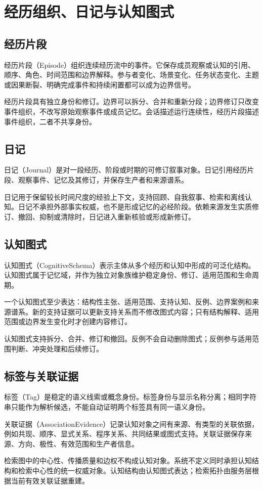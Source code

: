 \chapter{经历组织、日记与认知图式}

\section{经历片段}

经历片段（Episode）组织连续经历流中的事件。它保存成员观察或认知的引用、顺序、角色、时间范围和边界解释。参与者变化、场景变化、任务状态变化、主题或因果断裂、明确完成事件和持续闲置都可以成为边界信号。

经历片段具有独立身份和修订。边界可以拆分、合并和重新分段；边界修订只改变事件组织，不改写原始观察事件或成员记忆。会话描述运行连续性，经历片段描述事件组织，二者不共享身份。

\section{日记}

日记（Journal）是对一段经历、阶段或时期的可修订叙事对象。日记引用经历片段、观察事件、记忆及其修订，并保存生产者和来源谱系。

日记用于保留较长时间尺度的经验上下文，支持回顾、自我叙事、检索和离线认知。日记不承担外部事实权威，也不是形成记忆的必经阶段。依赖来源发生实质修订、撤回、抑制或清除时，日记进入重新核验或形成新修订。

\section{认知图式}

认知图式（CognitiveSchema）表示主体从多个经历和认知中形成的可泛化结构。认知图式属于记忆域，并作为独立对象族维护稳定身份、修订、适用范围和生命周期。

一个认知图式至少表达：结构性主张、适用范围、支持认知、反例、边界案例和来源谱系。新的支持证据可以更新支持关系而不修改图式内容；只有结构解释、适用范围或边界发生变化时才创建内容修订。

认知图式支持拆分、合并、修订和撤回。反例不会自动删除图式；反例参与适用范围判断、冲突处理和后续修订。

\section{标签与关联证据}

标签（Tag）是稳定的语义线索或概念身份。标签身份与显示名称分离；相同字符串只能作为解析候选，不能自动证明两个标签具有同一语义身份。

关联证据（AssociationEvidence）记录认知对象之间有来源、有类型的关联依据，例如共现、顺序、显式关系、程序关系、共同结果或图式支持。关联证据保存来源、方向、极性、有效范围和生产者信息。

检索图中的中心性、传播质量和边权不构成认知对象。系统不定义同时承担认知结构和检索中心性的统一权威对象。认知结构由认知图式表达；检索拓扑由服务层根据当前有效关联证据重建。
